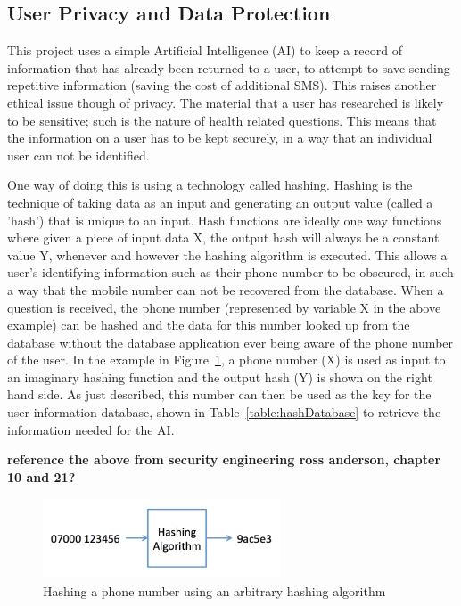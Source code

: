 \documentclass[authoryearcitations]{UoYCSproject}
\begin{document}
\subsection{User Privacy and Data Protection}
\label{subsubsec:userPrivacyAndDataProtection}
This project uses a simple Artificial Intelligence (AI) to keep a record of information that has already been returned to a user, to attempt to save sending repetitive information (saving the cost of additional SMS).  This raises another ethical issue though of privacy.  The material that a user has researched is likely to be sensitive; such is the nature of health related questions.  This means that the information on a user has to be kept securely, in a way that an individual user can not be identified.

One way of doing this is using a technology called hashing.  Hashing is the technique of taking data as an input and generating an output value (called a 'hash') that is unique to an input.  Hash functions are ideally one way functions where given a piece of input data X, the output hash will always be a constant value Y, whenever and however the hashing algorithm is executed.  This allows a user's identifying information such as their phone number to be obscured, in such a way that the mobile number can not be recovered from the database.  When a question is received, the phone number (represented by variable X in the above example) can be hashed and the data for this number looked up from the database without the database application ever being aware of the phone number of the user.  In the example in Figure~\ref{fig:hashPhoneNumber}, a phone number (X) is used as input to an imaginary hashing function and the output hash (Y) is shown on the right hand side.  As just described, this number can then be used as the key for the user information database, shown in Table~\ref{table:hashDatabase} to retrieve the information needed for the AI.

{\bf reference the above from security engineering ross anderson, chapter 10 and 21?}

\begin{figure}[htb]
    \centering
    \includegraphics[width=200pt]{hashPhoneNumber}
    \caption{Hashing a phone number using an arbitrary hashing algorithm}
    \label{fig:hashPhoneNumber}
\end{figure}
\end{document}

